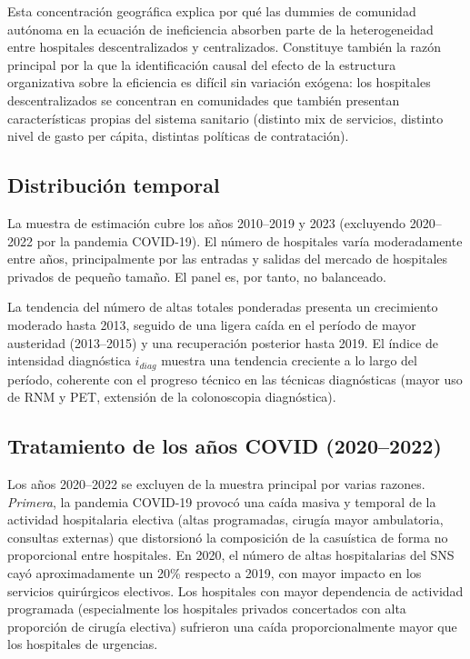Esta concentración geográfica explica por qué las dummies de comunidad autónoma en la ecuación de ineficiencia absorben parte de la heterogeneidad entre hospitales descentralizados y centralizados. Constituye también la razón principal por la que la identificación causal del efecto de la estructura organizativa sobre la eficiencia es difícil sin variación exógena: los hospitales descentralizados se concentran en comunidades que también presentan características propias del sistema sanitario (distinto mix de servicios, distinto nivel de gasto per cápita, distintas políticas de contratación).

\subsection{Distribución temporal}

La muestra de estimación cubre los años 2010--2019 y 2023 (excluyendo 2020--2022 por la pandemia COVID-19). El número de hospitales varía moderadamente entre años, principalmente por las entradas y salidas del mercado de hospitales privados de pequeño tamaño. El panel es, por tanto, no balanceado.

La tendencia del número de altas totales ponderadas presenta un crecimiento moderado hasta 2013, seguido de una ligera caída en el período de mayor austeridad (2013--2015) y una recuperación posterior hasta 2019. El índice de intensidad diagnóstica $i_{diag}$ muestra una tendencia creciente a lo largo del período, coherente con el progreso técnico en las técnicas diagnósticas (mayor uso de RNM y PET, extensión de la colonoscopia diagnóstica).

\subsection{Tratamiento de los años COVID (2020--2022)}

Los años 2020--2022 se excluyen de la muestra principal por varias razones. \textit{Primera}, la pandemia COVID-19 provocó una caída masiva y temporal de la actividad hospitalaria electiva (altas programadas, cirugía mayor ambulatoria, consultas externas) que distorsionó la composición de la casuística de forma no proporcional entre hospitales. En 2020, el número de altas hospitalarias del SNS cayó aproximadamente un 20\% respecto a 2019, con mayor impacto en los servicios quirúrgicos electivos. Los hospitales con mayor dependencia de actividad programada (especialmente los hospitales privados concertados con alta proporción de cirugía electiva) sufrieron una caída proporcionalmente mayor que los hospitales de urgencias.

